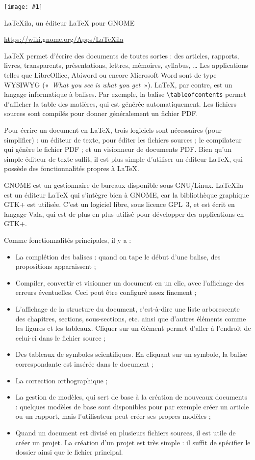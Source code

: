 \documentclass[a5paper,11pt]{article}
\def\titre#1#2{
  \noindent
  \begin{minipage}{0.14\linewidth}
  \texttt{[image: \#1]}
  \end{minipage}
  \begin{minipage}{0.85\linewidth}
    {\LARGE #2}

    \begin{flushright}
      \url{https://wiki.gnome.org/Apps/LaTeXila}
    \end{flushright}
  \end{minipage}

  \vspace{0.5cm}
}
\begin{document}
\titre{latexila.png}{\LaTeX{}ila, un éditeur \LaTeX{} pour GNOME}

\LaTeX{} permet d'écrire des documents de toutes sortes : des articles, rapports, livres, transparents, présentations, lettres, mémoires, syllabus, … Les applications telles que LibreOffice, Abiword ou encore Microsoft Word sont de type WYSIWYG («~\textit{What you see is what you get}~»). \LaTeX{}, par contre, est un langage informatique à balises. Par exemple, la balise \texttt{\textbackslash{}tableofcontents} permet d'afficher la table des matières, qui est générée automatiquement. Les fichiers sources sont compilés pour donner généralement un fichier PDF.

Pour écrire un document en \LaTeX{}, trois logiciels sont nécessaires (pour simplifier) : un éditeur de texte, pour éditer les fichiers sources ; le compilateur qui génère le fichier PDF ; et un visionneur de documents PDF. Bien qu'un simple éditeur de texte suffit, il est plus simple d'utiliser un éditeur \LaTeX{}, qui possède des fonctionnalités propres à \LaTeX{}.

GNOME est un gestionnaire de bureaux disponible sous GNU/Linux. \LaTeX{}ila est un éditeur \LaTeX{} qui s'intègre bien à GNOME, car la bibliothèque graphique GTK+ est utilisée. C'est un logiciel libre, sous licence GPL~3, et est écrit en langage Vala, qui est de plus en plus utilisé pour développer des applications en GTK+.

Comme fonctionnalités principales, il y a :
\begin{itemize}
  \item La complétion des balises : quand on tape le début d'une balise, des propositions apparaissent ;
  \item Compiler, convertir et visionner un document en un clic, avec l'affichage des erreurs éventuelles. Ceci peut être configuré assez finement ;
  \item L'affichage de la structure du document, c'est-à-dire une liste arborescente des chapitres, sections, sous-sections, etc. ainsi que d'autres éléments comme les figures et les tableaux. Cliquer sur un élément permet d'aller à l'endroit de celui-ci dans le fichier source ;
  \item Des tableaux de symboles scientifiques. En cliquant sur un symbole, la balise correspondante est insérée dans le document ;
  \item La correction orthographique ;
  \item La gestion de modèles, qui sert de base à la création de nouveaux documents : quelques modèles de base sont disponibles pour par exemple créer un article ou un rapport, mais l'utilisateur peut créer ses propres modèles ;
  \item Quand un document est divisé en plusieurs fichiers sources, il est utile de créer un projet. La création d'un projet est très simple : il suffit de spécifier le dossier ainsi que le fichier principal.
\end{itemize}
\end{document}
